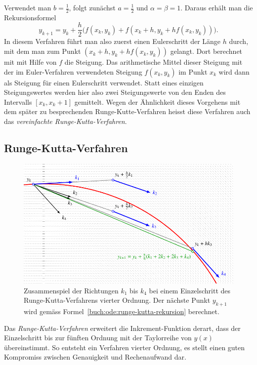 Verwendet man $b=\frac12$, folgt zunächst $a=\frac12$ und $\alpha=\beta=1$.
Daraus erhält man die Rekursionsformel
\begin{equation}
y_{k+1}=y_k+\frac{h}2\biggl(
f(x_k,y_k) + f(x_k+h, y_k + hf(x_k,y_k))
\biggr).
\label{buch:ode:simplified-runge-kutta}
\end{equation}
In diesem Verfahren führt man also zuerst einen Eulerschritt der Länge
$h$ durch, mit dem man zum Punkt $(x_k+h, y_k+hf(x_k,y_k))$ gelangt.
Dort berechnet mit mit Hilfe von $f$ die Steigung.
Das arithmetische Mittel dieser Steigung mit der im Euler-Verfahren
verwendeten Steigung $f(x_k,y_k)$ im Punkt $x_k$ wird dann als
Steigung für einen Eulerschritt verwendet.
Statt eines einzigen Steigungswertes werden hier also zwei Steigungswerte
von den Enden des Intervalls $[x_k,x_k+1]$ gemittelt.
Wegen der Ähnlichkeit dieses Vorgehens mit dem später zu besprechenden
Runge-Kutte-Verfahren heisst diese Verfahren auch das {\em
vereinfachte Runge-Kutta-Verfahren}.

\subsection{Runge-Kutta-Verfahren\label{subsection:buch:ode:runge-kutta}}
%
\begin{figure}
\centering
\includegraphics{chapters/50-ode/figures/rungekutta.pdf}
\caption{Zusammenspiel der Richtungen $k_1$ bis $k_4$ bei einem
Einzelschritt des Runge-Kutta-Verfahrens vierter Ordnung.
Der nächste Punkt $y_{k+1}$ wird gemäss
Formel~\eqref{buch:ode:runge-kutta-rekursion} berechnet.
\label{buch:ode:rk-step}}
\end{figure}
Das {\em Runge-Kutta-Verfahren} erweitert die Inkrement-Funktion derart,
dass der Einzelschritt bis zur fünften Ordnung mit der Taylorreihe von
$y(x)$ übereinstimmt.
So entsteht ein Verfahren vierter Ordnung, es stellt einen guten Kompromiss
zwischen Genauigkeit und Rechenaufwand dar.

